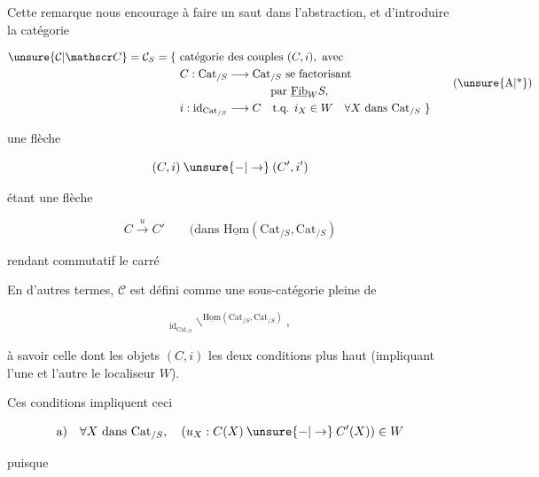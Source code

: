 Cette remarque nous encourage à faire un saut dans l'abstraction, et d'introduire la catégorie

\[
\begin{aligned}
\unsure{\mathcal C|\mathscr C}=\mathcal C_S=\{\ &\text{catégorie des couples }(C,i),\ \text{avec}\\
&C:\mathrm{Cat}_{/S}\longrightarrow\mathrm{Cat}_{/S}\ \text{se factorisant}\\
&\hspace{8em}\text{par }\underline{\mathrm{Fib}}_W S,\\
&i:\mathrm{id}_{\mathrm{Cat}_{/S}}\longrightarrow C\quad\text{t.q. }i_X\in W\quad\forall X\ \text{dans }\mathrm{Cat}_{/S}\ \}
\end{aligned}
\tag*{\makebox[0pt][l]{\hspace*{-\displaywidth}(\unsure{A|*})}}
\]

une flèche

\[
(C,i)\mathbin{\unsure{-|\to}}(C',i')
\]

étant une flèche

\[
C\xrightarrow{u}C'\qquad\text{(dans }\underline{\mathrm{Hom}}(\mathrm{Cat}_{/S},\mathrm{Cat}_{/S})
\]

rendant commutatif le carré


En d'autres termes, $\mathcal C$ est défini comme une sous-catégorie pleine de

\[
{}_{\mathrm{id}_{\mathrm{Cat}_{/S}}}\!\backslash^{\underline{\mathrm{Hom}}(\mathrm{Cat}_{/S},\mathrm{Cat}_{/S})},
\]

à savoir celle dont les objets $(C,i)$  les deux conditions  plus haut (impliquant l'une et l'autre le localiseur $W$).

Ces conditions impliquent ceci

\[
\text{a)}\quad\forall X\ \text{dans }\mathrm{Cat}_{/S},\quad (u_X:C(X)\mathbin{\unsure{-|\to}}C'(X))\in W
\]

 puisque


